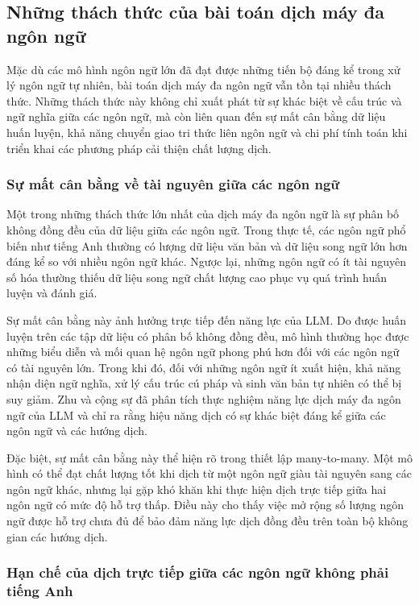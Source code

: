 \subsection{Những thách thức của bài toán dịch máy đa ngôn ngữ}
\label{sec:multilingual_mt_challenges}

Mặc dù các mô hình ngôn ngữ lớn đã đạt được những tiến bộ đáng kể trong xử lý ngôn ngữ tự nhiên, bài toán dịch máy đa ngôn ngữ vẫn tồn tại nhiều thách thức. Những thách thức này không chỉ xuất phát từ sự khác biệt về cấu trúc và ngữ nghĩa giữa các ngôn ngữ, mà còn liên quan đến sự mất cân bằng dữ liệu huấn luyện, khả năng chuyển giao tri thức liên ngôn ngữ và chi phí tính toán khi triển khai các phương pháp cải thiện chất lượng dịch.

\subsubsection{Sự mất cân bằng về tài nguyên giữa các ngôn ngữ}

Một trong những thách thức lớn nhất của dịch máy đa ngôn ngữ là sự phân bố không đồng đều của dữ liệu giữa các ngôn ngữ. Trong thực tế, các ngôn ngữ phổ biến như tiếng Anh thường có lượng dữ liệu văn bản và dữ liệu song ngữ lớn hơn đáng kể so với nhiều ngôn ngữ khác. Ngược lại, những ngôn ngữ có ít tài nguyên số hóa thường thiếu dữ liệu song ngữ chất lượng cao phục vụ quá trình huấn luyện và đánh giá.

Sự mất cân bằng này ảnh hưởng trực tiếp đến năng lực của LLM. Do được huấn luyện trên các tập dữ liệu có phân bố không đồng đều, mô hình thường học được những biểu diễn và mối quan hệ ngôn ngữ phong phú hơn đối với các ngôn ngữ có tài nguyên lớn. Trong khi đó, đối với những ngôn ngữ ít xuất hiện, khả năng nhận diện ngữ nghĩa, xử lý cấu trúc cú pháp và sinh văn bản tự nhiên có thể bị suy giảm. Zhu và cộng sự \cite{zhu-etal-2024-multilingual} đã phân tích thực nghiệm năng lực dịch máy đa ngôn ngữ của LLM và chỉ ra rằng hiệu năng dịch có sự khác biệt đáng kể giữa các ngôn ngữ và các hướng dịch.

Đặc biệt, sự mất cân bằng này thể hiện rõ trong thiết lập many-to-many. Một mô hình có thể đạt chất lượng tốt khi dịch từ một ngôn ngữ giàu tài nguyên sang các ngôn ngữ khác, nhưng lại gặp khó khăn khi thực hiện dịch trực tiếp giữa hai ngôn ngữ có mức độ hỗ trợ thấp. Điều này cho thấy việc mở rộng số lượng ngôn ngữ được hỗ trợ chưa đủ để bảo đảm năng lực dịch đồng đều trên toàn bộ không gian các hướng dịch.

\subsubsection{Hạn chế của dịch trực tiếp giữa các ngôn ngữ không phải tiếng Anh}

